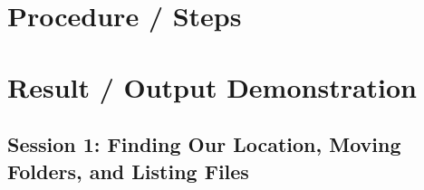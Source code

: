 \documentclass[10pt,a4paper]{article}
\begin{document}
\section{Procedure / Steps}
\vspace*{4.2cm}

\section{Result / Output Demonstration}

\subsection{Session 1: Finding Our Location, Moving Folders, and Listing Files}
\end{document}
